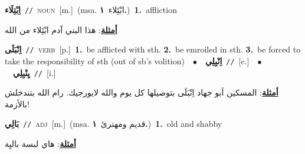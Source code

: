 \documentclass[10pt,a4paper,twoside]{article} %
\begin{document}
\begin{multicols}{2}
{\setlength\topsep{0pt}\textbf{\foreignlanguage{arabic}{اِبْتِلَاء}}\ {\color{gray}\texttt{//}\color{black}}\ \textsc{noun}\ [m.]\ \color{gray}(msa. \foreignlanguage{arabic}{ابْتَِلاء}~\foreignlanguage{arabic}{\textbf{١.}})\color{black}\ \textbf{1.}~affliction\  \begin{flushright}\color{gray}\foreignlanguage{arabic}{\textbf{\underline{\foreignlanguage{arabic}{أمثلة}}}: هذا البني آدم ابْتَِلاء من الله}\end{flushright}\color{black}} \vspace{2mm}

{\setlength\topsep{0pt}\textbf{\foreignlanguage{arabic}{اِنْبَلَى}}\ {\color{gray}\texttt{//}\color{black}}\ \textsc{verb}\ [p.]\ \textbf{1.}~be afflicted with sth.  \textbf{2.}~be emroiled in sth.  \textbf{3.}~be forced to take the responsibility of sth (out of sb's volition)\ \ $\bullet$\ \ \setlength\topsep{0pt}\textbf{\foreignlanguage{arabic}{اِنْبِلِي}}\ {\color{gray}\texttt{//}\color{black}}\ [c.]\ \ $\bullet$\ \ \setlength\topsep{0pt}\textbf{\foreignlanguage{arabic}{يِنْبِلِي}}\ {\color{gray}\texttt{//}\color{black}}\ [i.]\  \begin{flushright}\color{gray}\foreignlanguage{arabic}{\textbf{\underline{\foreignlanguage{arabic}{أمثلة}}}: المسكين أبو جهاد اِنْبَلَى بتوصيلها كل يوم والله لايورجيك. رام الله بتندخلش بالأزمة!}\end{flushright}\color{black}} \vspace{2mm}

{\setlength\topsep{0pt}\textbf{\foreignlanguage{arabic}{بَالِي}}\ {\color{gray}\texttt{//}\color{black}}\ \textsc{adj}\ [m.]\ \color{gray}(msa. \foreignlanguage{arabic}{قديم ومهترئ}~\foreignlanguage{arabic}{\textbf{١.}})\color{black}\ \textbf{1.}~old and shabby\  \begin{flushright}\color{gray}\foreignlanguage{arabic}{\textbf{\underline{\foreignlanguage{arabic}{أمثلة}}}: هاي لبسة باليِة}\end{flushright}\color{black}} \vspace{2mm}


\end{multicols}
\end{document}
